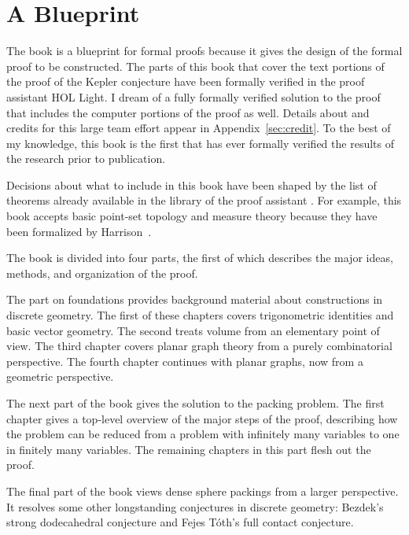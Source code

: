 \section*{A Blueprint}


The book is a blueprint for formal proofs because it gives the design
of the formal proof to be constructed.  
The parts of this book that cover the text portions of the proof of
the Kepler conjecture have been formally verified in the proof
assistant HOL Light.  I dream of a fully formally verified solution to
the proof that includes the computer portions of the proof
as well.  Details about and credits for this large team effort appear in
Appendix~\ref{sec:credit}.  To the best of my knowledge, this book is
the first that has ever formally verified the results of the research
prior to publication.

Decisions about what to
include in this book have been shaped by the list of theorems already
available in the library of the proof assistant .
For example, this book accepts basic point-set topology and measure
theory because they have been formalized by Harrison~\cite{HOLL}.


The book is divided into four parts, the first of which
 describes the major ideas, methods, and
organization of the proof.  


The part on foundations provides background material about
constructions in discrete geometry.  The first of these chapters
covers trigonometric identities and basic vector geometry.  The second
treats volume from an elementary point of view.  The third chapter
covers planar graph theory from a purely combinatorial perspective.
The fourth chapter continues with planar graphs, now from a geometric
perspective.

The next part of the book gives the solution to the packing problem.
The first chapter  gives a top-level overview of the major
steps of the proof,   describing how the problem can be reduced from
a problem with infinitely many variables to one in finitely many
variables.  The remaining chapters in this part flesh out the proof.

The final part of the book views dense sphere packings from a larger perspective.
It  resolves some other longstanding conjectures in
discrete geometry: Bezdek's strong dodecahedral conjecture and Fejes
T\'oth's full contact conjecture.  

